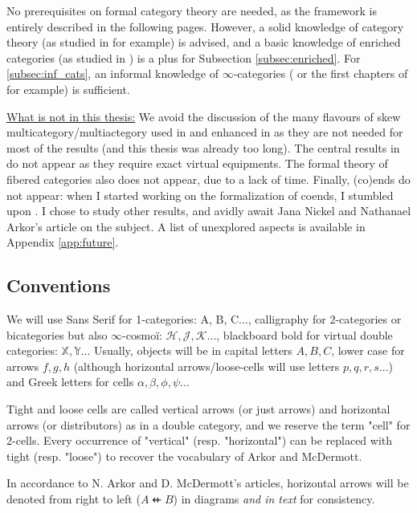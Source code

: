 \documentclass[10pt,a4paper]{article}
\newcommand{\bb}[1]{\mathbb{#1}}
\newcommand{\ca}[1]{\mathcal{#1}}
\newcommand{\cat}[1]{\textcat{#1}}
\newcommand{\textcat}[1]{{\normalfont\textsf{#1}}}
\newcommand{\dfrom}{\nvleftarrow}
\theoremstyle{plain}
\theoremstyle{definition}
\theoremstyle{remark}
\begin{document}
No prerequisites on formal category theory are needed, as the framework is entirely described in the following pages. However, a solid knowledge of category theory (as studied in \cite{riehl_context} for example) is advised, and a basic knowledge of enriched categories (as studied in \cite{kelly}) is a plus for Subsection \ref{subsec:enriched}. For \ref{subsec:inf_cats}, an informal knowledge of $\infty$-categories (\cite{groth2015shortcourseinftycategories} or the first chapters of \cite{cnossen} for example) is sufficient.

\underline{What is not in this thesis:} We avoid the discussion of the many flavours of skew multicategory/multiactegory used in \cite{arkor2024formaltheoryrelativemonads} and enhanced in \cite{rogers26monoid} as they are not needed for most of the results (and this thesis was already too long). The central results in \cite{arkor2024nervetheoremrelativemonads} do not appear as they require exact virtual equipments. The formal theory of fibered categories also does not appear, due to a lack of time. Finally, (co)ends do not appear: when I started working on the formalization of coends, I stumbled upon \cite{coend_nickel}. I chose to study other results, and avidly await Jana Nickel and Nathanael Arkor's article on the subject. A list of unexplored aspects is available in Appendix \ref{app:future}.

\subsection{Conventions}
\label{subsec:conventions}

We will use Sans Serif for 1-categories: \cat{A}, \cat{B}, \cat{C}..., calligraphy for 2-categories or bicategories but also $\infty$-cosmoï: $\ca{H}, \ca{J}, \ca{K}$..., blackboard bold for virtual double categories: $\bb{X}, \bb{Y}$... Usually, objects will be in capital letters $A, B, C$, lower case for arrows $f, g, h$ (although horizontal arrows/loose-cells will use letters $p, q, r, s$...) and Greek letters for cells $\alpha, \beta, \phi, \psi$...

Tight and loose cells are called vertical arrows (or just arrows) and horizontal arrows (or distributors) as in a double category, and we reserve the term "cell" for 2-cells. Every occurrence of "vertical" (resp. "horizontal") can be replaced with tight (resp. "loose") to recover the vocabulary of Arkor and McDermott.

In accordance to N. Arkor and D. McDermott's articles, horizontal arrows will be denoted from right to left ($A \dfrom B$) in diagrams \textit{and in text} for consistency.
\end{document}
